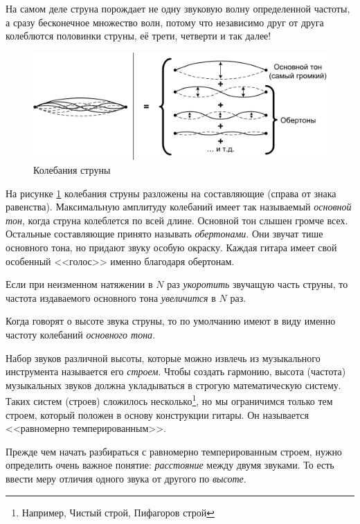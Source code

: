 На самом деле струна порождает не одну звуковую волну определенной частоты, а сразу бесконечное множество волн, потому что независимо друг от друга колеблются половинки струны, её трети, четверти и так далее!

\begin{figure}[!ht]
    \centering
    \includegraphics[width=\textwidth]{fig/string-moving} 
    \caption{Колебания струны}\label{fig:music:tone:stringmoving}
\end{figure} 

На рисунке \ref{fig:music:tone:stringmoving} колебания струны разложены на составляющие (справа от знака равенства). Максимальную амплитуду колебаний имеет так называемый \emph{основной тон}, когда струна колеблется по всей длине. Основной тон слышен громче всех. Остальные составляющие принято называть \emph{обертонами}. Они звучат тише основного тона, но придают звуку особую окраску. Каждая гитара имеет свой особенный <<голос>> именно благодаря обертонам.

\begin{Definition}
    Если при неизменном натяжении в $N$ раз \emph{укоротить} звучащую часть струны, то частота издаваемого основного тона \emph{увеличится} в $N$ раз.
\end{Definition}

Когда говорят о высоте звука струны, то по умолчанию имеют в виду именно частоту колебаний \emph{основного тона}.

Набор звуков различной высоты, которые можно извлечь из музыкального инструмента называется его \emph{строем}. Чтобы создать гармонию, высота (частота) музыкальных звуков должна укладываться в строгую математическую систему. Таких систем (строев) сложилось несколько\footnote{Например, Чистый строй, Пифагоров строй}, но мы ограничимся только тем строем, который положен в основу конструкции гитары. Он называется <<равномерно темперированным>>.

Прежде чем начать разбираться с равномерно темперированным строем, нужно определить очень важное понятие: \emph{расстояние} между двумя звуками. То есть ввести меру отличия одного звука от другого по \emph{высоте}. 

